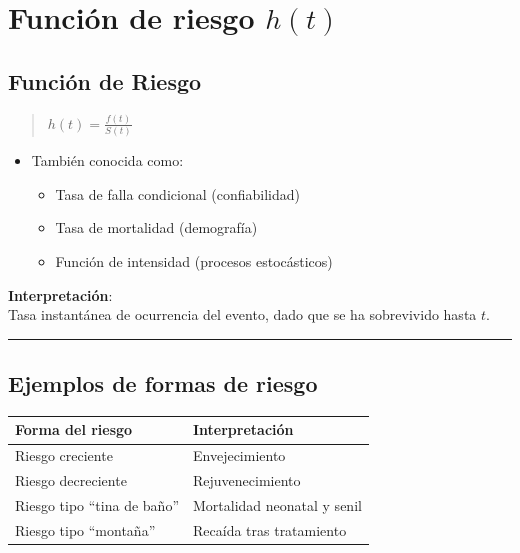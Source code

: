 \documentclass[
  letterpaper,
  DIV=11,
  numbers=noendperiod]{scrartcl}
\providecommand{\tightlist}{%
  \setlength{\itemsep}{0pt}\setlength{\parskip}{0pt}}
\begin{document}
\section{\texorpdfstring{Función de riesgo
\(h(t)\)}{Función de riesgo h(t)}}\label{funciuxf3n-de-riesgo-ht}

\subsection{Función de Riesgo}\label{funciuxf3n-de-riesgo}

\begin{quote}
\(h(t) = \frac{f(t)}{S(t)}\)
\end{quote}

\begin{itemize}
\tightlist
\item
  También conocida como:

  \begin{itemize}
  \tightlist
  \item
    Tasa de falla condicional (confiabilidad)
  \item
    Tasa de mortalidad (demografía)
  \item
    Función de intensidad (procesos estocásticos)
  \end{itemize}
\end{itemize}

\textbf{Interpretación}:\\
Tasa instantánea de ocurrencia del evento, dado que se ha sobrevivido
hasta \(t\).

\begin{center}\rule{0.5\linewidth}{0.5pt}\end{center}

\subsection{Ejemplos de formas de
riesgo}\label{ejemplos-de-formas-de-riesgo}

\begin{longtable}[]{@{}ll@{}}
\toprule\noalign{}
Forma del riesgo & Interpretación \\
\midrule\noalign{}
\endhead
\bottomrule\noalign{}
\endlastfoot
Riesgo creciente & Envejecimiento \\
Riesgo decreciente & Rejuvenecimiento \\
Riesgo tipo ``tina de baño'' & Mortalidad neonatal y senil \\
Riesgo tipo ``montaña'' & Recaída tras tratamiento \\
\end{longtable}
\end{document}

